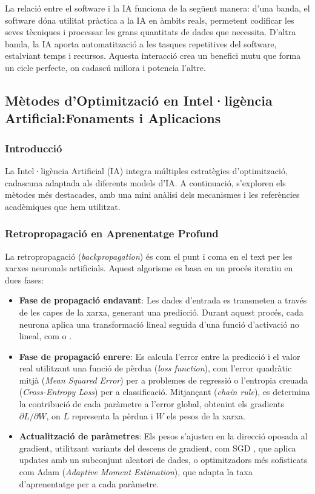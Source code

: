 La relació entre el software i la IA funciona de la següent manera: d'una banda, el software dóna utilitat pràctica a la IA en àmbits reals, permetent codificar les seves tècniques i processar les grans quantitats de dades que necessita. D'altra banda, la IA aporta automatització a les tasques repetitives del software, estalviant temps i recursos. Aquesta interacció crea un benefici mutu que forma un cicle perfecte, on cadascú millora i potencia l'altre.

\subsection{Mètodes d'Optimització en Intel·ligència Artificial:Fonaments i Aplicacions}\label{subsec:Optimització i Ajustos}

\subsubsection{Introducció}
La Intel·ligència Artificial (IA) integra múltiples estratègies d'optimització, cadascuna adaptada als diferents models d'IA. A continuació, s'exploren els mètodes més destacades, amb una mini anàlisi dels mecanismes i les referències acadèmiques que hem utilitzat.

\subsubsection{Retropropagació en Aprenentatge Profund}
La retropropagació (\textit{backpropagation}) és com el punt i coma en el text per les xarxes neuronals artificials. Aquest algorisme es basa en un procés iteratiu en dues fases:

\begin{itemize}
\item \textbf{Fase de propagació endavant}: Les dades d'entrada es transmeten a través de les capes de la xarxa, generant una predicció. Durant aquest procés, cada neurona aplica una transformació lineal seguida d'una funció d'activació no lineal, com \textit{} o \textit{}.

\item \textbf{Fase de propagació enrere}: Es calcula l'error entre la predicció i el valor real utilitzant una funció de pèrdua (\textit{loss function}), com l'error quadràtic mitjà (\textit{Mean Squared Error}) per a problemes de regressió o l'entropia creuada (\textit{Cross-Entropy Loss}) per a classificació. Mitjançant  (\textit{chain rule}), es determina la contribució de cada paràmetre a l'error global, obtenint els gradients $\partial L/\partial W$, on $L$ representa la pèrdua i $W$ els pesos de la xarxa.

\item \textbf{Actualització de paràmetres}: Els pesos s'ajusten en la direcció oposada al gradient, utilitzant variants del descens de gradient, com SGD \textit{}, que aplica updates amb un subconjunt aleatori de dades, o optimitzadors més sofisticats com Adam (\textit{Adaptive Moment Estimation}), que adapta la taxa d'aprenentatge per a cada paràmetre.
\end{itemize}

